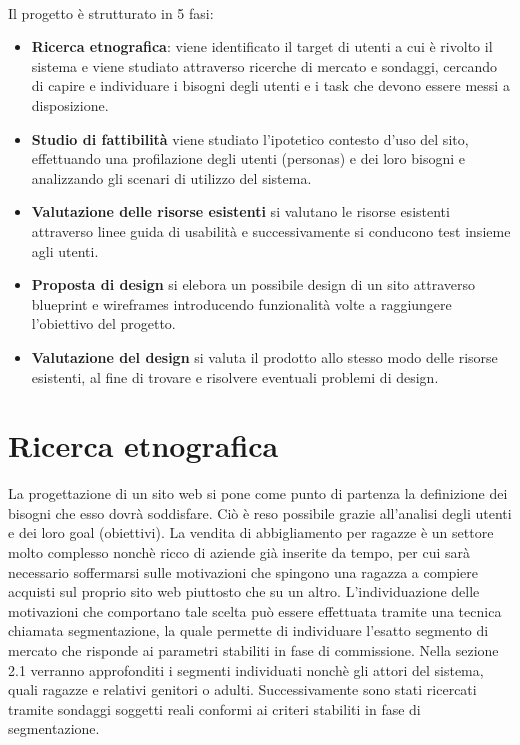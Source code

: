 \documentclass[12pt,a4paper]{report}
\begin{document}
\vspace{10mm}\\Il progetto è strutturato in 5 fasi:
\begin{itemize}
  \item \textbf{Ricerca etnografica}: viene identificato il target di utenti a cui è rivolto il sistema e viene studiato attraverso ricerche di mercato e sondaggi, cercando di capire e individuare i bisogni degli utenti e i task che devono essere messi a disposizione.
  \item \textbf{Studio di fattibilità} viene studiato l'ipotetico contesto d'uso del sito, effettuando una profilazione degli utenti (personas) e dei loro bisogni e analizzando gli scenari di utilizzo del sistema.
  \item \textbf{Valutazione delle risorse esistenti} si valutano le risorse esistenti attraverso linee guida di usabilità e successivamente si conducono test insieme agli utenti.
  \item \textbf{Proposta di design} si elebora un possibile design di un sito attraverso blueprint e wireframes introducendo funzionalità volte a raggiungere l'obiettivo del progetto.
  \item \textbf{Valutazione del design} si valuta il prodotto allo stesso modo delle risorse esistenti, al fine di trovare e risolvere eventuali problemi di design.
\end{itemize}
\chapter{Ricerca etnografica}
La progettazione di un sito web si pone come punto di partenza la definizione dei bisogni che esso dovrà soddisfare. Ciò è reso possibile grazie all'analisi degli utenti e dei loro goal (obiettivi). La vendita di abbigliamento per ragazze è un settore molto complesso nonchè ricco di aziende già inserite da tempo, per cui sarà necessario soffermarsi sulle motivazioni che spingono una ragazza a compiere acquisti sul proprio sito web piuttosto che su un altro. L'individuazione delle motivazioni che comportano tale scelta può essere effettuata tramite una tecnica chiamata segmentazione, la quale permette di individuare l'esatto segmento di mercato che risponde ai parametri stabiliti in fase di commissione. Nella sezione 2.1 verranno approfonditi i segmenti individuati nonchè gli attori del sistema, quali ragazze e relativi genitori o adulti. Successivamente sono stati ricercati tramite sondaggi soggetti reali conformi ai criteri stabiliti in fase di segmentazione.
\end{document}
